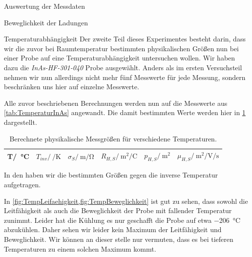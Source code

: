 \documentclass[pdftex, a4paper,11pt, twoside, ngerman]{report}
\begin{document}
\begin{chapter}{Auswertung der Messdaten}
\begin{section}{Beweglichkeit der Ladungen}
    \end{section}
   
   
   
    \begin{section}{Temperaturabhängigkeit}
      \label{chp:AuswertungTemperaturen}
      Der zweite Teil dieses Experimentes besteht darin, dass wir die zuvor
      bei Raumtemperatur bestimmten physikalischen Größen nun bei einer Probe
      auf eine Temperaturabhängigkeit untersuchen wollen.
      Wir haben dazu die \textit{InAs-HF-301-040} Probe ausgewählt.
      Anders als im ersten Versuchsteil nehmen wir nun allerdings nicht mehr
      fünf Messwerte für jede Messung, sondern beschränken uns hier auf einzelne
      Messwerte.
      
      Alle zuvor beschriebenen Berechnungen werden nun auf die Messwerte aus
      \cref{tab:TemperaturInAs} angewandt.
      Die damit bestimmten Werte werden hier in
      \cref{tab:TemperaturInAsResultate} dargestellt.
      
      \begin{table}[htbp]
        \centering
        \footnotesize
        \begin{tabular}{c|c|c|c|c|c}
          T/\SI{}{\celsius} & $T_{inv}/\SI{}{\per\kelvin}$ &
          $\sigma_{S}/\SI{}{\meter\per\ohm}$ &
          $R_{H,S}/\SI{}{\meter\squared\per\coulomb}$ &
          $p_{H,S}/\SI{}{\meter\squared}$ &
          $\mu_{H,S}/\SI{}{\meter\squared\per\volt\per\second}$ \\ \hline
          
        \end{tabular}
        \caption{Berechnete physikalische Messgrößen für verschiedene
            Temperaturen.}
        \label{tab:TemperaturInAsResultate}
      \end{table}
      
      In den  haben
      wir die bestimmten Größen gegen die inverse Temperatur aufgetragen.
      
      In \cref{fig:TempLeifaehigkeit,fig:TempBeweglichkeit} ist gut zu sehen,
      dass sowohl die Leitfähigkeit als auch die Beweglichkeit der Probe mit
      fallender Temperatur zunimmt.
      Leider hat die Kühlung es nur geschafft die Probe auf etwa 
      \SI{-206}{\celsius} abzukühlen.
      Daher sehen wir leider kein Maximum der Leitfähigkeit und Beweglichkeit.
      Wir können an dieser stelle nur vermuten, dass es bei tieferen
      Temperaturen zu einem solchen Maximum kommt.
      

\end{section}
\end{chapter}
\end{document}
